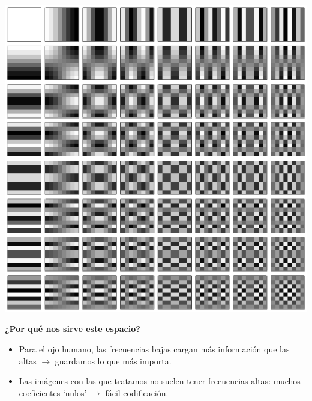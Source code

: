 \documentclass{beamer}
\begin{document}
\begin{frame}
    \begin{center}
        \includegraphics[scale=0.4]{fig/dctbase.png}
    \end{center}
\end{frame}

\begin{frame}
    \textbf{¿Por qué nos sirve este espacio?}
    \begin{itemize}
        \item Para el ojo humano, las frecuencias bajas cargan más información que las altas $\rightarrow$ guardamos lo que más importa.
        \item Las imágenes con las que tratamos no suelen tener frecuencias altas: muchos coeficientes `nulos' $\rightarrow$ fácil codificación.
    \end{itemize}
\end{frame}
\end{document}
